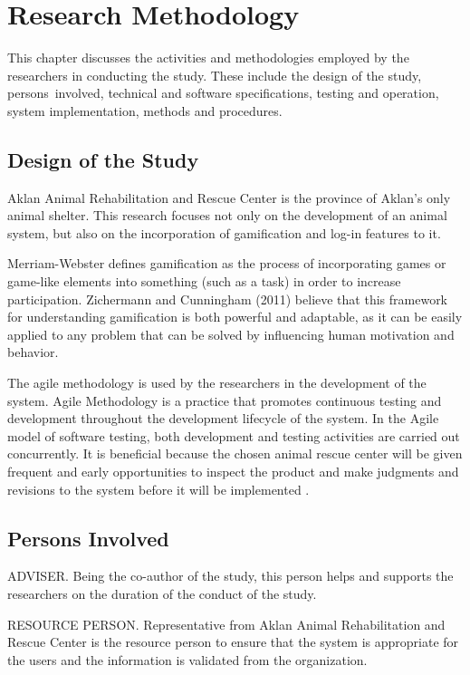 \chapter{Research Methodology}
This chapter discusses the activities and methodologies employed by the researchers in conducting the study. These include the design of the study, persons involved, technical and software specifications, testing and operation, system implementation, methods and procedures.

\section{Design of the Study}

Aklan Animal Rehabilitation and Rescue Center is the province of Aklan’s only
animal shelter. This research focuses not only on the development of an animal
system, but also on the incorporation of gamification and log-in features to it.

Merriam-Webster defines gamification as the process of incorporating games
or game-like elements into something (such as a task) in order to increase participation. Zichermann and Cunningham (2011) believe that this framework
for understanding gamification is both powerful and adaptable, as it can be easily
applied to any problem that can be solved by influencing human motivation and
behavior.

The agile methodology is used by the researchers in the development of the
system. Agile Methodology is a practice that promotes continuous testing and
development throughout the development lifecycle of the system. In the Agile
model of software testing, both development and testing activities are carried out
concurrently. It is beneficial because the chosen animal rescue center will be given
frequent and early opportunities to inspect the product and make judgments and
revisions to the system before it will be implemented \cite{hamilton2021agile}.

\section{Persons Involved}

ADVISER. Being the co-author of the study, this person helps and supports
the researchers on the duration of the conduct of the study.

RESOURCE PERSON. Representative from Aklan Animal Rehabilitation and
Rescue Center is the resource person to ensure that the system is appropriate for
the users and the information is validated from the organization.

